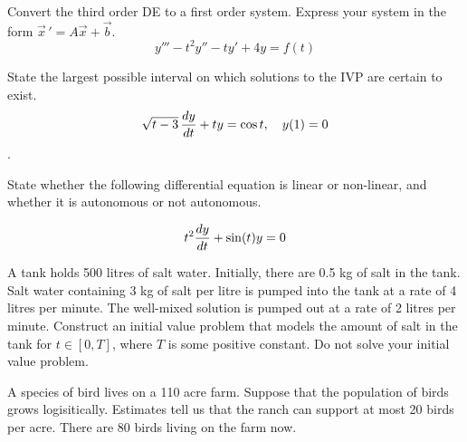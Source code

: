 \documentclass[12pt]{exam}
\begin{document}
    


\newpage


\InitialsRight

\begin{questions}

    \question[2] Convert the third order DE to a first order system. Express your system in the form $\vec x \, ' = A\vec x +\vec b$. 
    $$y'''-t^2 y'' -ty'+4y = f(t)$$
    
    \vspace{6cm}
    
    \question[1] State the largest possible interval on which solutions to the IVP are certain to exist. $$\sqrt{t-3} \, {\frac{dy}{dt}} + t y = \cos t, \quad y(1) = 0$$.
    
    \vspace{4cm}
    
    \question[1] State whether the following differential equation is linear or non-linear, and whether it is autonomous or not autonomous. 
    
    $$t^2{\frac{dy}{dt}} + \sin(t) y = 0$$
    
    \newpage 
    
    \question[3]  A tank holds 500 litres of salt water. Initially, there are 0.5 kg of salt in the tank. Salt water containing 3 kg of salt per litre is pumped into the tank at a rate of 4 litres per minute. The well-mixed solution is pumped out at a rate of 2 litres per minute. Construct an initial value problem that models the amount of salt in the tank for $t\in[0,T]$, where $T$ is some positive constant. Do not solve your initial value problem. 
    
    \vspace{6cm}
    
    \question[3] A species of bird lives on a 110 acre farm. Suppose that  the population of birds grows logisitically. Estimates tell us that the ranch can support at most 20 birds per acre. There are 80 birds living on the farm now. 


\end{questions}
\end{document}
